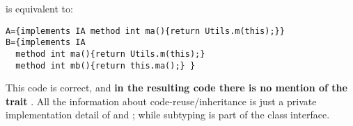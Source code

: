 \noindent is equivalent to:
  
\saveSpace \begin{lstlisting}
A={implements IA method int ma(){return Utils.m(this);}}
B={implements IA
  method int ma(){return Utils.m(this);}
  method int mb(){return this.ma();} } 
 \end{lstlisting}
\saveSpace 
 This code is correct, and {\bf in the resulting code there is no mention of the trait
 \Q@ta@}. All the information about code-reuse/inheritance
  is just a private implementation detail of \Q@A@
 and \Q@B@; while subtyping is part of the class interface.






